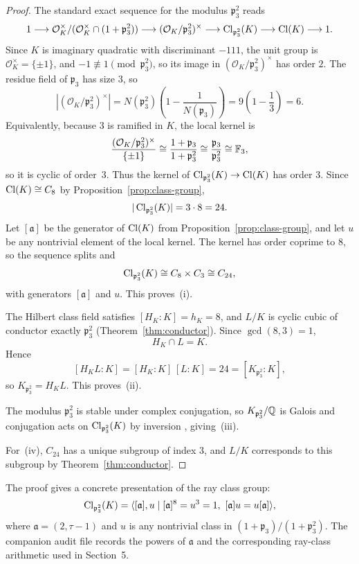 \begin{proof}
The standard exact sequence for the modulus \(\mathfrak p_3^2\) reads \cite[Ch.~VI]{Neukirch1999}
\[
1\longrightarrow \mathcal O_K^\times/(\mathcal O_K^\times\cap (1+\mathfrak p_3^2))
\longrightarrow (\mathcal O_K/\mathfrak p_3^2)^\times
\longrightarrow \operatorname{Cl}_{\mathfrak p_3^2}(K)
\longrightarrow \operatorname{Cl}(K)\longrightarrow 1.
\]
Since \(K\) is imaginary quadratic with discriminant \(-111\), the unit group is \(\mathcal O_K^\times=\{\pm 1\}\), and \(-1\not\equiv 1\pmod{\mathfrak p_3^2}\), so its image in \((\mathcal O_K/\mathfrak p_3^2)^\times\) has order \(2\). The residue field of \(\mathfrak p_3\) has size \(3\), so
\[
|(\mathcal O_K/\mathfrak p_3^2)^\times|
=N(\mathfrak p_3^2)\left(1-\frac{1}{N(\mathfrak p_3)}\right)
=9\left(1-\frac13\right)
=6.
\]
Equivalently, because \(3\) is ramified in \(K\), the local kernel is
\[
\frac{(\mathcal O_K/\mathfrak p_3^2)^\times}{\{\pm1\}}
\cong \frac{1+\mathfrak p_3}{1+\mathfrak p_3^2}
\cong \frac{\mathfrak p_3}{\mathfrak p_3^2}
\cong \mathbb{F}_3,
\]
so it is cyclic of order~\(3\). Thus the kernel of \(\operatorname{Cl}_{\mathfrak p_3^2}(K)\to \operatorname{Cl}(K)\) has order \(3\). Since \(\operatorname{Cl}(K)\cong C_8\) by Proposition~\ref{prop:class-group},
\[
|\operatorname{Cl}_{\mathfrak p_3^2}(K)|=3\cdot 8=24.
\]
Let \([\mathfrak a]\) be the generator of \(\operatorname{Cl}(K)\) from Proposition~\ref{prop:class-group}, and let \(u\) be any nontrivial element of the local kernel. The kernel has order coprime to \(8\), so the sequence splits and
\[
\operatorname{Cl}_{\mathfrak p_3^2}(K)\cong C_8\times C_3\cong C_{24},
\]
with generators \([\mathfrak a]\) and \(u\). This proves~(i).

The Hilbert class field satisfies \([H_K:K]=h_K=8\), and \(L/K\) is cyclic cubic of conductor exactly \(\mathfrak p_3^2\) (Theorem~\ref{thm:conductor}). Since \(\gcd(8,3)=1\),
\[
H_K\cap L=K.
\]
Hence
\[
[H_KL:K]=[H_K:K]\,[L:K]=24=[K_{\mathfrak p_3^2}:K],
\]
so \(K_{\mathfrak p_3^2}=H_KL\). This proves~(ii).

The modulus \(\mathfrak p_3^2\) is stable under complex conjugation, so \(K_{\mathfrak p_3^2}/\mathbb{Q}\) is Galois and conjugation acts on \(\operatorname{Cl}_{\mathfrak p_3^2}(K)\) by inversion \cite[Ch.~9]{Cox2012}, giving~(iii).

For~(iv), \(C_{24}\) has a unique subgroup of index \(3\), and \(L/K\) corresponds to this subgroup by Theorem~\ref{thm:conductor}.
\end{proof}

\begin{remark}\label{rem:ray-class-explicit}
The proof gives a concrete presentation of the ray class group:
\[
\operatorname{Cl}_{\mathfrak p_3^2}(K)=\langle [\mathfrak a],u \mid [\mathfrak a]^8=u^3=1,\ [\mathfrak a]u=u[\mathfrak a]\rangle,
\]
where \(\mathfrak a=(2,\tau-1)\) and \(u\) is any nontrivial class in \((1+\mathfrak p_3)/(1+\mathfrak p_3^2)\). The companion audit file records the powers of \(\mathfrak a\) and the corresponding ray-class arithmetic used in Section~5.
\end{remark}

